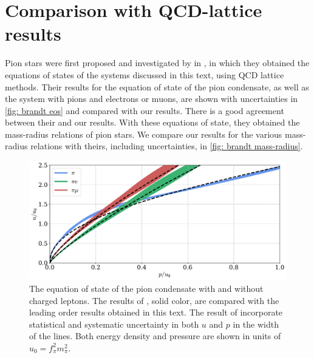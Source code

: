 \section{Comparison with QCD-lattice results}


Pion stars were first proposed and investigated by \citeauthor{brandtNewClassCompact2018} in \autocite{brandtNewClassCompact2018}, in which they obtained the equations of states of the systems discussed in this text, using QCD lattice methods.
Their results for the equation of state of the pion condensate, as well as the system with pions and electrons or muons, are shown with uncertainties in \autoref{fig: brandt eos} and compared with our results.
There is a good agreement between their and our results.
With these equations of state, they obtained the mass-radius relations of pion stars.
We compare our results for the various mass-radius relations with theirs, including uncertainties, in \autoref{fig: brandt mass-radius}. 

\begin{figure}[!htb]
    \centering
    \includegraphics[width=.8\textwidth]{../scripts/figurer/brandt_eos.pdf}
    \caption{
        The equation of state of the pion condensate with and without charged leptons.
        The results of \citeauthor{brandtNewClassCompact2018}, solid color, are compared with the leading order results obtained in this text.
        The result of \citeauthor{brandtNewClassCompact2018} incorporate statistical and systematic uncertainty in both $u$ and $p$ in the width of the lines.
        Both energy density and pressure are shown in units of $u_0 = f_\pi^2 m_\pi^2$.
    }
    \label{fig: brandt eos}
\end{figure}



